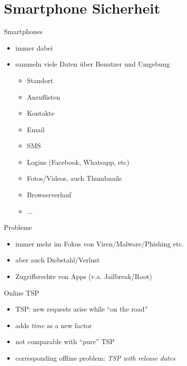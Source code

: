 \section[Smartphones]{Smartphone Sicherheit}

\begin{frame}{}
  \begin{center}
    \structure{\Large \insertsection}
  \end{center}
\end{frame}


\begin{frame}{Smartphones}
  \begin{itemize}
	  \item immer dabei
	  \item sammeln viele Daten über Benutzer und Umgebung
	  \begin{itemize}
	  \item Standort
	  \item Anruflisten
	  \item Kontakte
	  \item Email
	  \item SMS
	  \item Logins (Facebook, Whatsapp, etc)
	  \item Fotos/Videos, auch Thumbnails
	  \item Browserverlauf
	  \item ...
	  \end{itemize}
  \end{itemize}

\end{frame}

\begin{frame}{Probleme}
  \begin{itemize}
    \item immer mehr im Fokus von Viren/Malware/Phishing etc.
    \item aber auch Diebstahl/Verlust
    \item Zugriffsrechte von Apps (v.a. Jailbreak/Root)
  \end{itemize}
\end{frame}

\begin{frame}{Online TSP}
  \begin{itemize}
    \item TSP: new requests arise while ``on the road''
    \item adds \emph{time} as a new factor
    \item not comparable with ``pure'' TSP
    \item corresponding offline problem: \emph{TSP with release dates}
  \end{itemize}
\end{frame}

